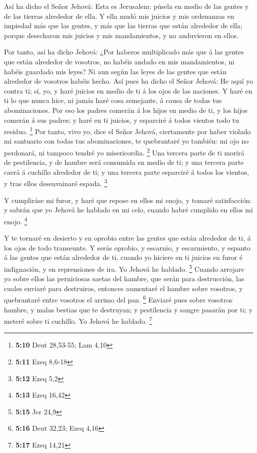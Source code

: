  Así ha dicho el Señor Jehová: Esta es Jerusalem: púsela en
medio de las gentes y de las tierras alrededor de ella.  Y
ella mudó mis juicios y mis ordenanzas en impiedad más que las gentes, y
más que las tierras que están alrededor de ella; porque desecharon mis
juicios y mis mandamientos, y no anduvieron en ellos.

 Por tanto, así ha dicho Jehová: ¿Por haberos multiplicado
más que á las gentes que están alrededor de vosotros, no habéis andado
en mis mandamientos, ni habéis guardado mis leyes? Ni aun según las
leyes de las gentes que están alrededor de vosotros habéis hecho.
 Así pues ha dicho el Señor Jehová: He aquí yo contra ti;
sí, yo, y haré juicios en medio de ti á los ojos de las naciones.
 Y haré en ti lo que nunca hice, ni jamás haré cosa
semejante, á causa de todas tus abominaciones.  Por eso los
padres comerán á los hijos en medio de ti, y los hijos comerán á sus
padres; y haré en ti juicios, y esparciré á todos vientos todo tu
residuo. \footnote{\textbf{5:10} Deut 28,53-55; Lam 4,10} 
Por tanto, vivo yo, dice el Señor Jehová, ciertamente por haber violado
mi santuario con todas tus abominaciones, te quebrantaré yo también: mi
ojo no perdonará, ni tampoco tendré yo misericordia. \footnote{\textbf{5:11}
  Ezeq 8,6-18}  Una tercera parte de ti morirá de
pestilencia, y de hambre será consumida en medio de ti; y una tercera
parte caerá á cuchillo alrededor de ti; y una tercera parte esparciré á
todos los vientos, y tras ellos desenvainaré espada. \footnote{\textbf{5:12}
  Ezeq 5,2}

 Y cumpliráse mi furor, y haré que repose en ellos mi
enojo, y tomaré satisfacción: y sabrán que yo Jehová he hablado en mi
celo, cuando habré cumplido en ellos mi enojo. \footnote{\textbf{5:13}
  Ezeq 16,42}

 Y te tornaré en desierto y en oprobio entre las gentes que
están alrededor de ti, á los ojos de todo transeunte.  Y
serás oprobio, y escarnio, y escarmiento, y espanto á las gentes que
están alrededor de ti, cuando yo hiciere en ti juicios en furor é
indignación, y en reprensiones de ira. Yo Jehová he hablado. \footnote{\textbf{5:15}
  Jer 24,9}  Cuando arrojare yo sobre ellos las perniciosas
saetas del hambre, que serán para destrucción, las cuales enviaré para
destruiros, entonces aumentaré el hambre sobre vosotros, y quebrantaré
entre vosotros el arrimo del pan. \footnote{\textbf{5:16} Deut 32,23;
  Ezeq 4,16}  Enviaré pues sobre vosotros hambre, y malas
bestias que te destruyan; y pestilencia y sangre pasarán por ti; y
meteré sobre ti cuchillo. Yo Jehová he hablado. \footnote{\textbf{5:17}
  Ezeq 14,21}

